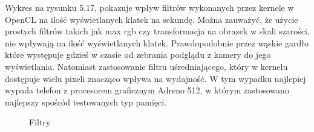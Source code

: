 Wykres na rysunku 5.17, pokazuje wpływ filtrów wykonanych przez kernele w OpenCL na ilość wyświetlanych klatek na sekundę. Można zauważyć, że użycie prostych filtrów takich jak max rgb czy transformacja na obrazek w skali szarości, nie wpływają na ilość wyświetlanych klatek. Prawdopodobnie przez wąskie gardło które występuje gdzieś w czasie od zebrania podglądu z kamery do jego wyświetlania. Natomiast zastosowanie filtru uśredniającego, który w kernelu dostępuje wielu pixeli znacząco wpływa na wydajność. W tym wypadku najlepiej wypada telefon z procesorem graficznym Adreno 512, w którym zastosowano najlepszy spośród testowanych typ pamięci.

\begin{figure}[H]
\caption{Filtry}
\end{figure}
